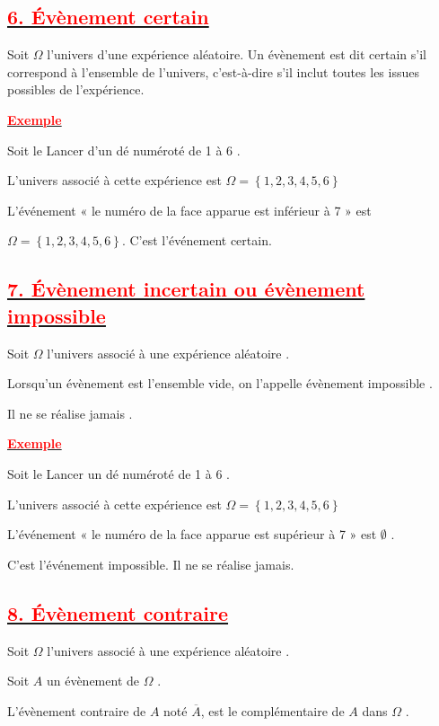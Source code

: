 \documentclass[12pt,a4paper]{article}
\begin{document}
\subsection*{\underline{\textbf{\textcolor{red}{6. Évènement certain}}}}
Soit $\Omega$ l'univers d'une expérience aléatoire. Un évènement est dit certain s'il correspond à l'ensemble de l'univers, c'est-à-dire s'il inclut toutes les issues possibles de l'expérience.

\underline{\textbf{\textcolor{red}{Exemple}}}

Soit le Lancer d’un dé numéroté de 1 à 6 .

L’univers associé à cette expérience est $\Omega = \left\lbrace 1, 2, 3, 4, 5, 6\right\rbrace $

L’événement « le numéro de la face apparue est inférieur à 7 » est 

$\Omega = \left\lbrace 1, 2, 3, 4, 5, 6\right\rbrace $. C’est l’événement certain.

\subsection*{\underline{\textbf{\textcolor{red}{7. Évènement incertain ou évènement impossible}}}}
Soit $\Omega$ l’univers associé à une expérience aléatoire .

Lorsqu’un évènement est l’ensemble vide, on l’appelle évènement impossible .

Il ne se réalise jamais .

\underline{\textbf{\textcolor{red}{Exemple}}}

Soit le Lancer un dé numéroté de 1 à 6 .

L’univers associé à cette expérience est $\Omega = \left\lbrace 1, 2, 3, 4, 5, 6 \right\rbrace $

L’événement « le numéro de la face apparue est supérieur à 7 » est $\emptyset$ .

C’est l’événement impossible. Il ne se réalise jamais.
\subsection*{\underline{\textbf{\textcolor{red}{8. Évènement contraire}}}}

Soit $\Omega$ l’univers associé à une expérience aléatoire .

Soit $A$ un évènement de $\Omega$ . 

L’évènement contraire de $A$ noté $\overline{A}$, est le complémentaire de $A$ dans $\Omega$ .
\end{document}

